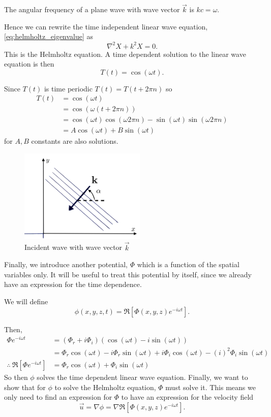 \begin{defn}\label{defn:frequency}
The angular frequency of a plane wave with wave vector $\vec{k}$ is $kc= \omega$.
\end{defn}\par

Hence we can rewrite the time independent linear wave equation, \eqref{eq:helmholtz_eigenvalue} as
\begin{equation}\label{eq:helmholtz}
  \nabla^2 X + k^2X = 0.
\end{equation}
This is the Helmholtz equation. A time dependent solution to the linear wave equation is then
\begin{equation}
  T(t) = \cos(\omega t).
\end{equation}

Since $T(t)$ is time periodic $T(t)= T(t+2\pi n)$ so
\begin{align*}
  T(t) &= \cos(\omega t) \\
      &= \cos(\omega (t + 2\pi n)) \\
      &= \cos(\omega t) \cos(\omega 2\pi n) - \sin(\omega t) \sin (\omega 2\pi n) \\
      &= A \cos(\omega t) + B \sin(\omega t)
\end{align*}
for $A, B$ constants are also solutions.

\begin{figure}
  \centering
  \includegraphics[width=6cm]{../figures/sk_incident_wave_2.png}
  \caption{Incident wave with wave vector $\vec{k}$}
  \label{fig:incident_wave}
\end{figure}

Finally, we introduce another potential, $\Phi$ which is a function of the spatial variables only. It will be useful to treat this potential by itself, since we already have an expression for the time dependence.

We will define
  \[\phi (x, y, z, t) = \Re[ \Phi(x,y,z)e^{-i\omega t} ]. \]

Then,
\begin{align*}
  \Phi e^{-i\omega t}
  &= (\Phi_r+i\Phi_i) (\cos(\omega t) - i\sin(\omega t)) \\
  &= \Phi_r \cos(\omega t)
      - i \Phi_r \sin(\omega t)
      + i \Phi_i \cos(\omega t)
      - (i)^2 \Phi_i \sin(\omega t)\\
  \therefore~ \Re[\Phi e^{-i\omega t}]
  &= \Phi_r \cos(\omega t) + \Phi_i \sin(\omega t)
\end{align*}
So then $\phi$ solves the time dependent linear wave equation. Finally, we want to show that for $\phi$ to solve the Helmholtz equation, $\Phi$ must solve it. This means we only need to find an expression for $\Phi$ to have an expression for the velocity field
\[\vec{u} = \nabla \phi = \nabla \Re[ \Phi(x,y,z)e^{-i\omega t} ].\]

